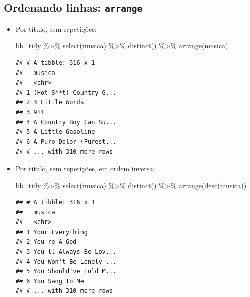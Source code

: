 \documentclass[
  11pt]{report}
\newenvironment{Shaded}{\begin{snugshade}}{\end{snugshade}}
\newcommand{\FunctionTok}[1]{\textcolor[rgb]{0.00,0.00,0.00}{#1}}
\newcommand{\NormalTok}[1]{#1}
\newcommand{\SpecialCharTok}[1]{\textcolor[rgb]{0.00,0.00,0.00}{#1}}
\renewenvironment{Shaded}{
    \begin{mdframed}[%
      roundcorner=2pt,%
      innerleftmargin=5pt,%
      innerrightmargin=5pt,%
      topline=true,%
      leftline=true,%
      rightline=true,%
      bottomline=true,%
      linewidth=0.5pt,%
      linecolor=black!20,%
      backgroundcolor=black!2,%
      skipabove=2ex,%
      skipbelow=2.5ex%
    ]%
  }
  {
    \end{mdframed}
  }
\begin{document}
\hypertarget{ordenando-linhas-arrange}{%
\subsection{\texorpdfstring{Ordenando linhas: \texttt{arrange}}{Ordenando linhas: arrange}}\label{ordenando-linhas-arrange}}

\begin{itemize}
\item
  Por título, sem repetições:

\begin{Shaded}
\begin{Highlighting}[]
\NormalTok{bb\_tidy }\SpecialCharTok{\%\textgreater{}\%} 
  \FunctionTok{select}\NormalTok{(musica) }\SpecialCharTok{\%\textgreater{}\%} 
  \FunctionTok{distinct}\NormalTok{() }\SpecialCharTok{\%\textgreater{}\%} 
  \FunctionTok{arrange}\NormalTok{(musica)}
\end{Highlighting}
\end{Shaded}

\begin{verbatim}
## # A tibble: 316 x 1
##   musica                 
##   <chr>                  
## 1 (Hot S**t) Country G...
## 2 3 Little Words         
## 3 911                    
## 4 A Country Boy Can Su...
## 5 A Little Gasoline      
## 6 A Puro Dolor (Purest...
## # ... with 310 more rows
\end{verbatim}
\item
  Por título, sem repetições, em ordem inversa:

\begin{Shaded}
\begin{Highlighting}[]
\NormalTok{bb\_tidy }\SpecialCharTok{\%\textgreater{}\%} 
  \FunctionTok{select}\NormalTok{(musica) }\SpecialCharTok{\%\textgreater{}\%} 
  \FunctionTok{distinct}\NormalTok{() }\SpecialCharTok{\%\textgreater{}\%} 
  \FunctionTok{arrange}\NormalTok{(}\FunctionTok{desc}\NormalTok{(musica))}
\end{Highlighting}
\end{Shaded}

\begin{verbatim}
## # A tibble: 316 x 1
##   musica                 
##   <chr>                  
## 1 Your Everything        
## 2 You're A God           
## 3 You'll Always Be Lov...
## 4 You Won't Be Lonely ...
## 5 You Should've Told M...
## 6 You Sang To Me         
## # ... with 310 more rows
\end{verbatim}
\end{itemize}
\end{document}
